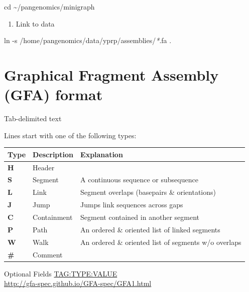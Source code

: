 \documentclass[
]{book}
\newenvironment{Shaded}{\begin{snugshade}}{\end{snugshade}}
\newcommand{\AttributeTok}[1]{\textcolor[rgb]{0.77,0.63,0.00}{#1}}
\newcommand{\BuiltInTok}[1]{#1}
\newcommand{\FunctionTok}[1]{\textcolor[rgb]{0.00,0.00,0.00}{#1}}
\newcommand{\NormalTok}[1]{#1}
\newcommand{\PreprocessorTok}[1]{\textcolor[rgb]{0.56,0.35,0.01}{\textit{#1}}}
\providecommand{\tightlist}{%
  \setlength{\itemsep}{0pt}\setlength{\parskip}{0pt}}
\begin{document}
\begin{Shaded}
\begin{Highlighting}[]
\BuiltInTok{cd}\NormalTok{ \textasciitilde{}/pangenomics/minigraph}
\end{Highlighting}
\end{Shaded}

\begin{enumerate}
\def\labelenumi{\arabic{enumi}.}
\setcounter{enumi}{3}
\tightlist
\item
  Link to data
\end{enumerate}

\begin{Shaded}
\begin{Highlighting}[]
\FunctionTok{ln} \AttributeTok{{-}s}\NormalTok{ /home/pangenomics/data/yprp/assemblies/}\PreprocessorTok{*}\NormalTok{.fa .}
\end{Highlighting}
\end{Shaded}

\hypertarget{graphical-fragment-assembly-gfa-format}{%
\section{Graphical Fragment Assembly (GFA) format}\label{graphical-fragment-assembly-gfa-format}}

Tab-delimited text

Lines start with one of the following types:

\begin{longtable}[]{@{}lll@{}}
\toprule
Type & Description & Explanation \\
\midrule
\endhead
\textbf{H} & Header & \\
\textbf{S} & Segment & A continuous sequence or subsequence \\
\textbf{L} & Link & Segment overlaps (basepairs \& orientations) \\
\textbf{J} & Jump & Jumps link sequences across gaps \\
\textbf{C} & Containment & Segment contained in another segment \\
\textbf{P} & Path & An ordered \& oriented list of linked segments \\
\textbf{W} & Walk & An ordered \& oriented list of segments w/o overlaps \\
\textbf{\#} & Comment & \\
\bottomrule
\end{longtable}

Optional Fields \url{TAG:TYPE:VALUE}\\
\url{http://gfa-spec.github.io/GFA-spec/GFA1.html}
\end{document}
